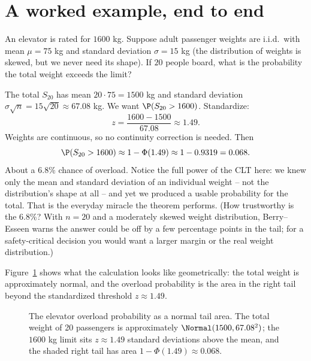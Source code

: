 \section{A worked example, end to end}
\label{ch21:worked}

\begin{example}
\label{ch21:ex-elevator}
An elevator is rated for $1600$ kg. Suppose adult passenger weights are i.i.d.\ with
mean $\mu = 75$ kg and standard deviation $\sigma = 15$ kg (the distribution of weights
is skewed, but we never need its shape). If $20$ people board, what is the probability
the total weight exceeds the limit?

The total $S_{20}$ has mean $20 \cdot 75 = 1500$ kg and standard deviation
$\sigma\sqrt{n} = 15\sqrt{20} \approx 67.08$ kg. We want $\P(S_{20} > 1600)$.
Standardize:
\[
  z = \frac{1600 - 1500}{67.08} \approx 1.49.
\]
Weights are continuous, so no continuity correction is needed. Then
\[
  \P(S_{20} > 1600) \approx 1 - \Phi(1.49) \approx 1 - 0.9319 = 0.068.
\]
About a $6.8\%$ chance of overload. Notice the full power of the CLT here: we knew only
the mean and standard deviation of an individual weight -- not the distribution's shape
at all -- and yet we produced a usable probability for the total. That is the everyday
miracle the theorem performs. (How trustworthy is the $6.8\%$? With $n=20$ and a
moderately skewed weight distribution, Berry--Esseen warns the answer could be off by a
few percentage points in the tail; for a safety-critical decision you would want a
larger margin or the real weight distribution.)
\end{example}

Figure~\ref{ch21:fig-tail} shows what the calculation looks like geometrically: the
total weight is approximately normal, and the overload probability is the area in the
right tail beyond the standardized threshold $z \approx 1.49$.

\begin{figure}[H]
\centering
{}
\caption{The elevator overload probability as a normal tail area. The total weight of
20 passengers is approximately $\Normal(1500, 67.08^2)$; the $1600$ kg limit sits
$z \approx 1.49$ standard deviations above the mean, and the shaded right tail has area
$1 - \Phi(1.49) \approx 0.068$.}
\label{ch21:fig-tail}
\end{figure}

